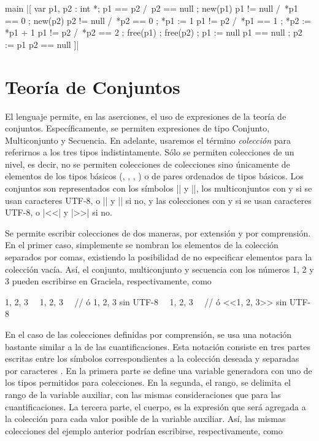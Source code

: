 \begin{gracielacode}
main
  |[ var p1, p2 : int *; { p1 == p2 /\ p2 == null }
   ; new(p1)             { p1 != null /\ *p1 == 0 }
   ; new(p2)             { p2 != null /\ *p2 == 0 }
   ; *p1 := 1            { p1 != p2 /\ *p1 == 1 }
   ; *p2 := *p1 + 1      { p1 != p2 /\ *p2 == 2 }
   ; free(p1)
   ; free(p2)
   ; p1 := null          { p1 == null }
   ; p2 := p1            { p2 == null }
  ]|
\end{gracielacode}

\section{Teoría de Conjuntos}

El lenguaje permite, en las aserciones, el uso de expresiones de la teoría de
conjuntos. Específicamente, se permiten expresiones de tipo Conjunto,
Multiconjunto y Secuencia. En adelante, usaremos el término \textit{colección}
para referirnos a los tres tipos indistintamente. Sólo se permiten colecciones
de un nivel, es decir, no se permiten colecciones de colecciones sino únicamente
de elementos de los tipos básicos (, , ,
) o de pares ordenados de tipos básicos. Los conjuntos son
representados con los símbolos \ingra|{| y \ingra|}|, los multiconjuntos con
\Lbag{} y \Rbag{} si se usan caracteres UTF-8, o \ingra|{{| y \ingra|}}| si no, y
las colecciones con \Lseq{} y \Rseq{} si se usan caracteres UTF-8, o \ingra|<<| y
\ingra|>>| si no.

Se permite escribir colecciones de dos maneras, por extensión y por comprensión.
En el primer caso, simplemente se nombran los elementos de la colección
separados por comas, existiendo la posibilidad de no especificar elementos para
la colección vacía. Así, el conjunto, multiconjunto y secuencia con los números
1, 2 y 3 pueden escribirse en Graciela, respectivamente, como

\begin{gracielacode}
{1, 2, 3}
~\Lbag~1, 2, 3~\Rbag~ // ó {{1, 2, 3}} sin UTF-8
~\Lseq~1, 2, 3~\Rseq~ // ó <<1, 2, 3>> sin UTF-8
\end{gracielacode}

En el caso de las colecciones definidas por comprensión, se usa una notación
bastante similar a la de las cuantificaciones. Esta notación consiste en tres
partes escritas entre los símbolos correspondientes a la colección deseada y
separadas por caracteres \ingra{|}. En la primera parte se define una variable
generadora con uno de los tipos permitidos para colecciones. En la segunda, el
rango, se delimita el rango de la variable auxiliar, con las mismas
consideraciones que para las cuantificaciones. La tercera parte, el cuerpo, es
la expresión que será agregada a la colección para cada valor posible de la
variable auxiliar. Así, las mismas colecciones del ejemplo anterior podrían
escribirse, respectivamente, como

